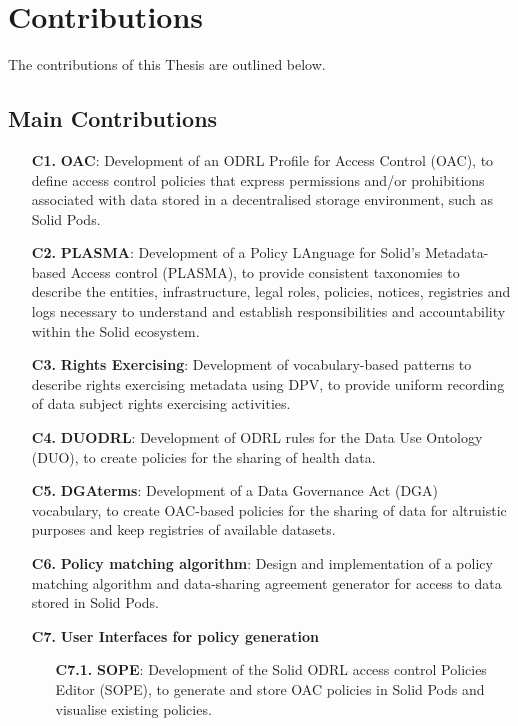 \section{Contributions}
\label{sec:contributions}

The contributions of this Thesis are outlined below.

\subsection{Main Contributions}
\label{sec:contr_main}

\begin{enumerate}
    \item [\textbf{C1.}] \textbf{OAC}: Development of an ODRL Profile for Access Control (OAC), to define access control policies that express permissions and/or prohibitions associated with data stored in a decentralised storage environment, such as Solid Pods.
    \item [\textbf{C2.}] \textbf{PLASMA}: Development of a Policy LAnguage for Solid’s Metadata-based Access control (PLASMA), to provide consistent taxonomies to describe the entities, infrastructure, legal roles, policies, notices, registries and logs necessary to understand and establish responsibilities and accountability within the Solid ecosystem.
    \item [\textbf{C3.}] \textbf{Rights Exercising}: Development of vocabulary-based patterns to describe rights exercising metadata using DPV, to provide uniform recording of data subject rights exercising activities.
    \item [\textbf{C4.}] \textbf{DUODRL}: Development of ODRL rules for the Data Use Ontology (DUO), to create policies for the sharing of health data.
    \item [\textbf{C5.}] \textbf{DGAterms}: Development of a Data Governance Act (DGA) vocabulary, to create OAC-based policies for the sharing of data for altruistic purposes and keep registries of available datasets.
    \item [\textbf{C6.}] \textbf{Policy matching algorithm}: Design and implementation of a policy matching algorithm and data-sharing agreement generator for access to data stored in Solid Pods.
    \item [\textbf{C7.}] \textbf{User Interfaces for policy generation}
    \begin{enumerate}
    \item [\textbf{C7.1.}] \textbf{SOPE}: Development of the Solid ODRL access control Policies Editor (SOPE), to generate and store OAC policies in Solid Pods and visualise existing policies.

\end{enumerate}
\end{enumerate}
